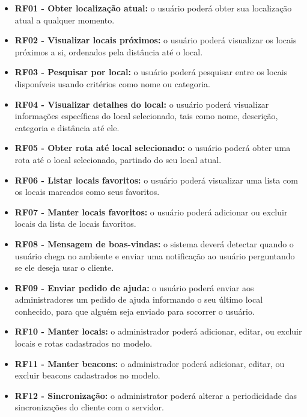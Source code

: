 \documentclass[english,brazilian]{UNISINOSmonografia}
\begin{document}
\begin{itemize}
	\item \textbf{RF01 - Obter localização atual:} o usuário poderá obter sua localização atual a qualquer momento.
		
	\item \textbf{RF02 - Visualizar locais próximos:} o usuário poderá visualizar os locais próximos a si, ordenados pela distância até o local.
		
	\item \textbf{RF03 - Pesquisar por local:} o usuário poderá pesquisar entre os locais disponíveis usando critérios como nome ou categoria.
		
	\item \textbf{RF04 - Visualizar detalhes do local:} o usuário poderá visualizar informações específicas do local selecionado, tais como nome, descrição, categoria e distância até ele.

	\item \textbf{RF05 - Obter rota até local selecionado:} o usuário poderá obter uma rota até o local selecionado, partindo do seu local atual.

	\item \textbf{RF06 - Listar locais favoritos:} o usuário poderá visualizar uma lista com os locais marcados como seus favoritos.
		
	\item \textbf{RF07 - Manter locais favoritos:} o usuário poderá adicionar ou excluir locais da lista de locais favoritos.
		
	\item \textbf{RF08 - Mensagem de boas-vindas:} o sistema deverá detectar quando o usuário chega no ambiente e enviar uma notificação ao usuário perguntando se ele deseja usar o cliente.

	\item \textbf{RF09 - Enviar pedido de ajuda:} o usuário poderá enviar aos administradores um pedido de ajuda informando o seu último local conhecido, para que alguém seja enviado para socorrer o usuário.
		
	\item \textbf{RF10 - Manter locais:} o administrador poderá adicionar, editar, ou excluir locais e rotas cadastrados no modelo.
		
	\item \textbf{RF11 - Manter beacons:} o administrador poderá adicionar, editar, ou excluir beacons cadastrados no modelo.

	\item \textbf{RF12 - Sincronização:} o administrator poderá alterar a periodicidade das sincronizações do cliente com o servidor.

\end{itemize}
\end{document}
